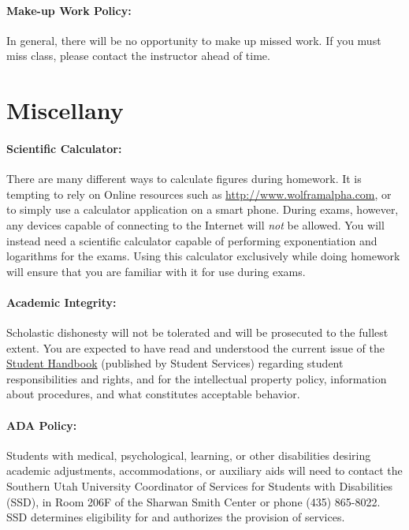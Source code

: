 \documentclass[12pt, letterpaper]{article}
\begin{document}
\paragraph{Make-up Work Policy:}
In general, there will be no opportunity to make up missed work. If you must miss class, please contact the instructor ahead of time.

\section*{Miscellany}

\paragraph{Scientific Calculator:}
There are many different ways to calculate figures during homework. It is tempting to rely on Online resources such as \href{http://www.wolframalpha.com}{http://www.wolframalpha.com}, or to simply use a calculator application on a smart phone. During exams, however, any devices capable of connecting to the Internet will \emph{not} be allowed. You will instead need a scientific calculator capable of performing exponentiation and logarithms for the exams. Using this calculator exclusively while doing homework will ensure that you are familiar with it for use during exams.

\paragraph{Academic Integrity:}
Scholastic dishonesty will not be tolerated and will be prosecuted to the fullest extent. You are expected to have read and understood the current issue of the \href{https://help.suu.edu/handbook}{Student Handbook} (published by Student Services) regarding student responsibilities and rights, and for the intellectual property policy, information about procedures, and what constitutes acceptable behavior.

\paragraph{ADA Policy:}
Students with medical, psychological, learning, or other disabilities desiring academic adjustments, accommodations, or auxiliary aids will need to contact the Southern Utah University Coordinator of Services for Students with Disabilities (SSD), in Room 206F of the Sharwan Smith Center or phone (435) 865-8022. SSD determines eligibility for and authorizes the provision of services.
\end{document}
